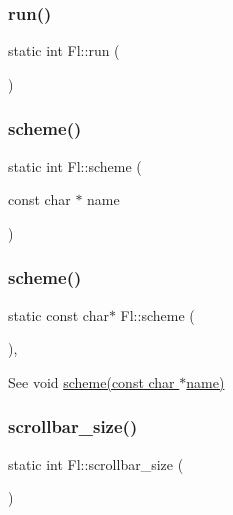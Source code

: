 \subsubsection{\texorpdfstring{run()}{run()}}
{\footnotesize\ttfamily static int Fl\+::run (\begin{DoxyParamCaption}{ }\end{DoxyParamCaption})\hspace{0.3cm}{\ttfamily [static]}}

\mbox{\label{class_fl_ad774b1783b1860e39556e209062648eb}} 
\subsubsection{\texorpdfstring{scheme()}{scheme()}\hspace{0.1cm}{\footnotesize\ttfamily [1/2]}}
{\footnotesize\ttfamily static int Fl\+::scheme (\begin{DoxyParamCaption}\item[{const char $\ast$}]{name }\end{DoxyParamCaption})\hspace{0.3cm}{\ttfamily [static]}}

\mbox{\label{class_fl_a48e0d5ea99335d7e4cdcf45d8dbe68b7}} 
\subsubsection{\texorpdfstring{scheme()}{scheme()}\hspace{0.1cm}{\footnotesize\ttfamily [2/2]}}
{\footnotesize\ttfamily static const char$\ast$ Fl\+::scheme (\begin{DoxyParamCaption}{ }\end{DoxyParamCaption})\hspace{0.3cm}{\ttfamily [inline]}, {\ttfamily [static]}}

See void \hyperlink{class_fl_ad774b1783b1860e39556e209062648eb}{scheme(const char $\ast$name)} \mbox{\label{class_fl_ae861b8bd4f2d4dcbec7be697e8b4b80e}} 
\subsubsection{\texorpdfstring{scrollbar\+\_\+size()}{scrollbar\_size()}\hspace{0.1cm}{\footnotesize\ttfamily [1/2]}}
{\footnotesize\ttfamily static int Fl\+::scrollbar\+\_\+size (\begin{DoxyParamCaption}{ }\end{DoxyParamCaption})\hspace{0.3cm}{\ttfamily [static]}}

